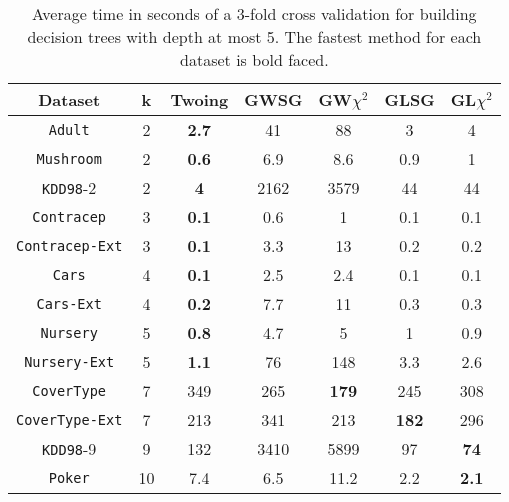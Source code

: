\begin{table*}[]
\small
\centering
\caption{Average time in seconds of a 3-fold cross validation
for building decision trees with depth at most 5.
The fastest method for each dataset is bold faced.}
\begin{tabular}{c|c|c|c|c|c|c}
Dataset & k & Twoing  & GWSG  &         GW$\chi^2$      & GLSG  & GL$\chi^2$      \\ \hline
{\tt Adult}         & 2 & {\bf  2.7} & 41   & 88   & 3   & 4   \\
{\tt Mushroom}      & 2 & {\bf 0.6} & 6.9  & 8.6  & 0.9 & 1   \\
{\tt KDD98}-2       & 2 & {\bf 4}   & 2162 & 3579 & 44  & 44  \\
{\tt Contracep}     & 3 & {\bf 0.1} & 0.6  & 1    & 0.1 & 0.1 \\
{\tt Contracep-Ext} & 3 & {\bf 0.1} & 3.3  & 13   & 0.2 & 0.2 \\
{\tt Cars}          & 4 & {\bf 0.1} & 2.5  & 2.4  & 0.1 & 0.1 \\
{\tt Cars-Ext}      & 4 & {\bf 0.2} & 7.7  & 11   & 0.3 & 0.3 \\
{\tt Nursery}       & 5 & {\bf 0.8} & 4.7  & 5    & 1   & 0.9 \\
{\tt Nursery-Ext}   & 5 & {\bf 1.1} & 76  & 148  & 3.3 & 2.6   \\
{\tt CoverType}     & 7 & 349 & 265  & {\bf 179}  & 245 & 308 \\
{\tt CoverType-Ext} & 7 & 213 & 341  & 213  & {\bf 182} & 296 \\
{\tt KDD98}-9       & 9 & 132 & 3410 & 5899 & 97  & {\bf 74}  \\ 
{\tt Poker}     & 10 & 7.4 & 6.5 & 11.2 & 2.2  & {\bf 2.1}  
\end{tabular}
\label{tab:time}
\end{table*}


